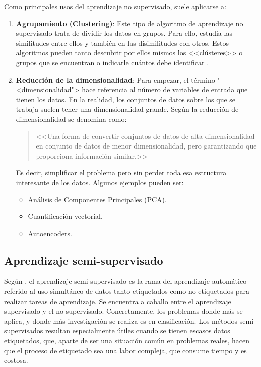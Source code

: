 Como principales usos del aprendizaje no supervisado, suele aplicarse a:
\vspace{-4px}
\begin{enumerate}
    \item \textbf{Agrupamiento (Clustering)}: Este tipo de algoritmo de
    aprendizaje no supervisado trata de dividir los datos en grupos. Para ello,
    estudia las similitudes entre ellos y también en las disimilitudes con
    otros. Estos algoritmos pueden tanto descubrir por ellos mismos los
    <<clústeres>> o grupos que se encuentran o indicarle cuántos debe
    identificar \cite{salim:usl}.
    \item \textbf{Reducción de la dimensionalidad}: Para empezar, el término
    "<dimensionalidad"> hace referencia al número de variables de entrada que
    tienen los datos. En la realidad, los conjuntos de datos sobre los que se
    trabaja suelen tener una dimensionalidad grande. Según
    \cite{javatpoint:reduccionsdims} la reducción de dimensionalidad se denomina
    como: \begin{quote}<<Una forma de convertir conjuntos de datos de alta dimensionalidad en
    conjunto de datos de menor dimensionalidad, pero garantizando que proporciona
    información similar.>>\end{quote} Es decir, simplificar el problema pero sin perder
    toda esa estructura interesante de los datos. Algunos ejemplos pueden ser:
    \begin{itemize}
        \item Análisis de Componentes Principales (PCA).
        \item Cuantificación vectorial.
        \item Autoencoders.
    \end{itemize}
\end{enumerate}

\subsection{Aprendizaje semi-supervisado}

Según \cite{vanEngelen2020}, el aprendizaje semi-supervisado es la rama del
aprendizaje automático referido al uso simultáneo de datos tanto etiquetados
como no etiquetados para realizar tareas de aprendizaje. Se encuentra a caballo
entre el aprendizaje supervisado y el no supervisado. Concretamente, los
problemas donde más se aplica, y donde más investigación se realiza es en
clasificación. Los métodos semi-supervisados resultan especialmente útiles
cuando se tienen escasos datos etiquetados, que, aparte de ser una situación
común en problemas reales, hacen que el proceso de etiquetado sea una labor
compleja, que consume tiempo y es costosa.

